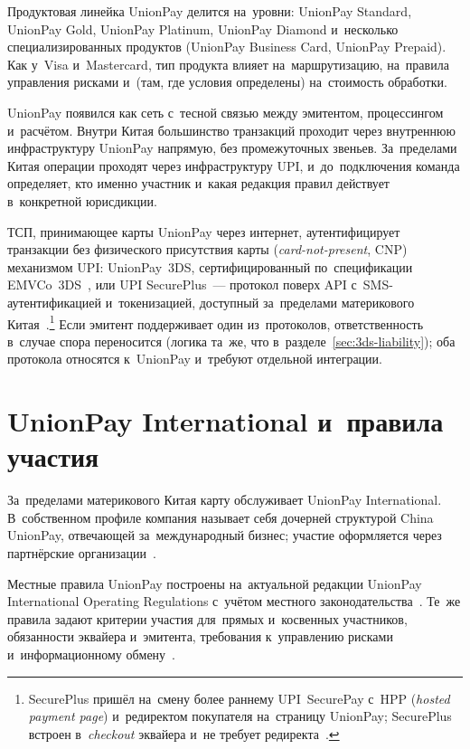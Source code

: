 Продуктовая линейка UnionPay делится на~уровни: UnionPay Standard,
UnionPay Gold, UnionPay Platinum, UnionPay Diamond и~несколько
специализированных продуктов (UnionPay Business Card, UnionPay Prepaid). Как
у~Visa и~Mastercard, тип продукта влияет на~маршрутизацию, на~правила
управления рисками и~(там, где условия определены) на~стоимость обработки.

UnionPay появился как сеть с~тесной связью между эмитентом, процессингом
и~расчётом. Внутри Китая большинство транзакций проходит через внутреннюю
инфраструктуру UnionPay напрямую, без промежуточных звеньев. За~пределами Китая
операции проходят через инфраструктуру UPI, и~до~подключения команда определяет,
кто именно участник и~какая редакция правил действует в~конкретной юрисдикции.

ТСП, принимающее карты UnionPay через интернет, аутентифицирует транзакции без
физического присутствия карты (\textit{card-not-present}, CNP) механизмом UPI: UnionPay~3DS, сертифицированный по~спецификации
EMVCo~3DS~\cite{unionpay-3ds-emvco}, или UPI SecurePlus~--- протокол поверх API
с~SMS-аутентификацией и~токенизацией, доступный за~пределами материкового
Китая~\cite{unionpay-secureplus}.\footnote{SecurePlus пришёл на~смену более
  раннему UPI~SecurePay с~HPP (\textit{hosted payment page}) и~редиректом
  покупателя на~страницу UnionPay; SecurePlus встроен в~\textit{checkout} эквайера и~не
требует редиректа~\cite{unionpay-secureplus}.} Если эмитент поддерживает один
из~протоколов, ответственность в~случае спора переносится (логика та~же, что
в~разделе~\ref{sec:3ds-liability}); оба протокола относятся к~UnionPay
и~требуют отдельной интеграции.

\section{UnionPay International и~правила участия}\label{sec:up-international}

За~пределами материкового Китая карту обслуживает UnionPay International.
В~собственном профиле компания называет себя дочерней структурой China
UnionPay, отвечающей за~международный бизнес; участие оформляется через
партнёрские организации~\cite{unionpay-international-about}.

Местные правила UnionPay построены на~актуальной редакции UnionPay International Operating Regulations с~учётом
местного законодательства~\cite{unionpay-russia-rules}. Те~же правила задают
критерии участия для~прямых и~косвенных участников, обязанности эквайера
и~эмитента, требования к~управлению рисками и~информационному
обмену~\cite{unionpay-russia-rules}.

